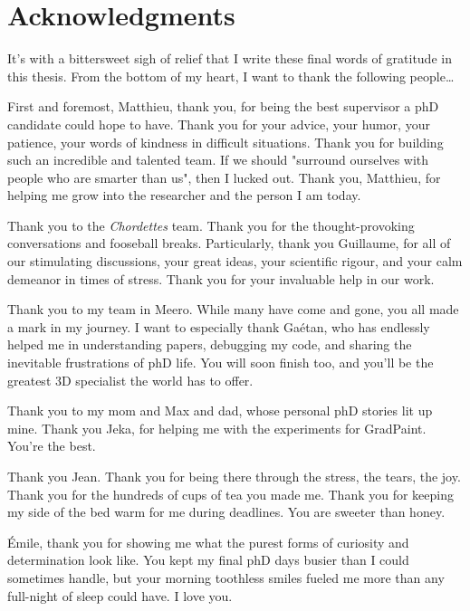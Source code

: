 
\cleardoublepage
\chapter{Acknowledgments}

It's with a bittersweet sigh of relief that I write these final words of gratitude in this thesis. 
From the bottom of my heart, I want to thank the following people\dots

First and foremost, Matthieu, thank you, for being the best supervisor a phD candidate could 
hope to have. Thank you for your advice, your humor, your patience, your words of kindness in difficult situations. 
Thank you for building such an incredible and talented team. If we should "surround ourselves with people who are smarter than us", then I 
lucked out. Thank you, Matthieu, for helping me grow into the researcher and the person 
I am today. 

Thank you to the \textit{Chordettes} team. Thank you for the thought-provoking conversations and 
fooseball breaks. Particularly, thank you Guillaume, for all of our stimulating discussions, your 
great ideas, your scientific rigour,  and your calm demeanor in times of stress.  Thank you for your invaluable help 
in our work.

Thank you to my team in Meero. While many have come and gone, you all made a mark in my journey. 
I want to especially thank Gaétan, who has endlessly helped me in understanding papers, debugging my code, 
and sharing the inevitable frustrations of phD life. You will soon finish too, and you'll be the greatest 
3D specialist the world has to offer.

Thank you to my mom and Max and dad, whose personal phD stories lit up mine. Thank you 
Jeka, for helping me with the experiments for GradPaint. You're the best.

Thank you Jean. Thank you for being there through the stress, the tears, the joy. 
Thank you for the hundreds of cups of tea you made me. 
Thank you for keeping my side of the bed warm for me during deadlines.
You are sweeter than honey.

Émile, thank you for showing me what the purest forms of curiosity and 
determination look like. You kept my final phD days busier than I could 
sometimes handle, but your morning toothless smiles fueled me more than 
any full-night of sleep could have. I love you.


